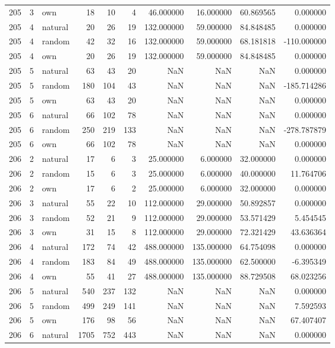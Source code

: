 \begin{table}[htbp]
\begin{tabular}{rrlrrrrrrr}
205 & 3 & own & 18 & 10 & 4 & 46.000000 & 16.000000 & 60.869565 & 0.000000 \\
205 & 4 & natural & 20 & 26 & 19 & 132.000000 & 59.000000 & 84.848485 & 0.000000 \\
205 & 4 & random & 42 & 32 & 16 & 132.000000 & 59.000000 & 68.181818 & -110.000000 \\
205 & 4 & own & 20 & 26 & 19 & 132.000000 & 59.000000 & 84.848485 & 0.000000 \\
205 & 5 & natural & 63 & 43 & 20 & NaN & NaN & NaN & 0.000000 \\
205 & 5 & random & 180 & 104 & 43 & NaN & NaN & NaN & -185.714286 \\
205 & 5 & own & 63 & 43 & 20 & NaN & NaN & NaN & 0.000000 \\
205 & 6 & natural & 66 & 102 & 78 & NaN & NaN & NaN & 0.000000 \\
205 & 6 & random & 250 & 219 & 133 & NaN & NaN & NaN & -278.787879 \\
205 & 6 & own & 66 & 102 & 78 & NaN & NaN & NaN & 0.000000 \\
206 & 2 & natural & 17 & 6 & 3 & 25.000000 & 6.000000 & 32.000000 & 0.000000 \\
206 & 2 & random & 15 & 6 & 3 & 25.000000 & 6.000000 & 40.000000 & 11.764706 \\
206 & 2 & own & 17 & 6 & 2 & 25.000000 & 6.000000 & 32.000000 & 0.000000 \\
206 & 3 & natural & 55 & 22 & 10 & 112.000000 & 29.000000 & 50.892857 & 0.000000 \\
206 & 3 & random & 52 & 21 & 9 & 112.000000 & 29.000000 & 53.571429 & 5.454545 \\
206 & 3 & own & 31 & 15 & 8 & 112.000000 & 29.000000 & 72.321429 & 43.636364 \\
206 & 4 & natural & 172 & 74 & 42 & 488.000000 & 135.000000 & 64.754098 & 0.000000 \\
206 & 4 & random & 183 & 84 & 49 & 488.000000 & 135.000000 & 62.500000 & -6.395349 \\
206 & 4 & own & 55 & 41 & 27 & 488.000000 & 135.000000 & 88.729508 & 68.023256 \\
206 & 5 & natural & 540 & 237 & 132 & NaN & NaN & NaN & 0.000000 \\
206 & 5 & random & 499 & 249 & 141 & NaN & NaN & NaN & 7.592593 \\
206 & 5 & own & 176 & 98 & 56 & NaN & NaN & NaN & 67.407407 \\
206 & 6 & natural & 1705 & 752 & 443 & NaN & NaN & NaN & 0.000000 \\

\end{tabular}
\end{table}
